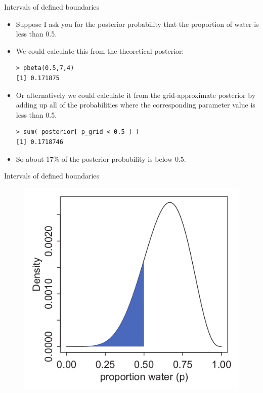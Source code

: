 \documentclass[handout]{beamer}
\begin{document}
\begin{frame}[fragile]{Intervals of defined boundaries}
\scriptsize{
\begin{itemize}

\item Suppose I ask you for the posterior probability that the proportion of water is less than 0.5. 

\item We could calculate this from the theoretical posterior:

\begin{verbatim}
> pbeta(0.5,7,4)
[1] 0.171875
\end{verbatim}



\item Or alternatively we could calculate it from the grid-approximate posterior by adding up all of the probabilities where the corresponding parameter value is less than 0.5.

\begin{verbatim}
> sum( posterior[ p_grid < 0.5 ] )
[1] 0.1718746
\end{verbatim}


\item So about 17\% of the posterior probability is below 0.5.

\end{itemize}



} 

\end{frame}



\begin{frame}{Intervals of defined boundaries}
\scriptsize{

   \begin{figure}[h!]
	\centering
	\includegraphics[scale=0.45]{pics/interval1.png}
	\end{figure} 




} 

\end{frame}
\end{document}
